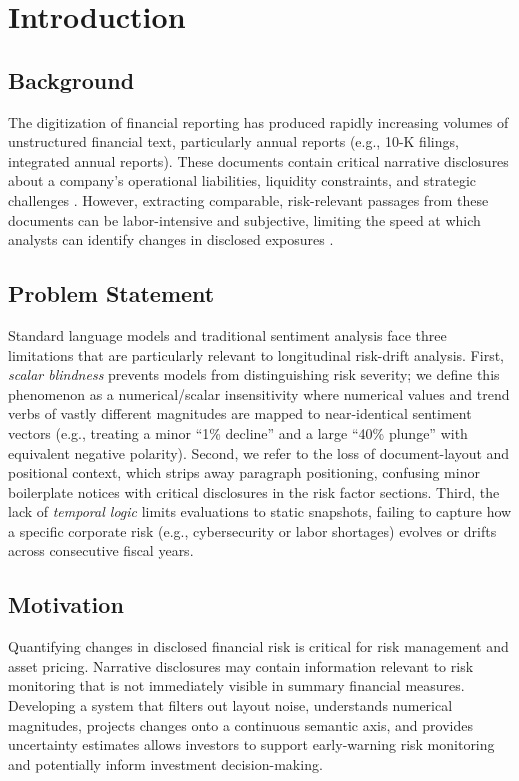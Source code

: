 \documentclass[pdflatex,sn-basic,Numbered]{sn-jnl}
\begin{document}
\maketitle

\section{Introduction}

\subsection{Background}
The digitization of financial reporting has produced rapidly increasing volumes of unstructured financial text, particularly annual reports (e.g., 10-K filings, integrated annual reports). These documents contain critical narrative disclosures about a company's operational liabilities, liquidity constraints, and strategic challenges \cite{campbell2014, kravet2013, linsley2006}. However, extracting comparable, risk-relevant passages from these documents can be labor-intensive and subjective, limiting the speed at which analysts can identify changes in disclosed exposures \cite{fisher2016}.

\subsection{Problem Statement}
Standard language models and traditional sentiment analysis face three limitations that are particularly relevant to longitudinal risk-drift analysis. First, \textit{scalar blindness} prevents models from distinguishing risk severity; we define this phenomenon as a numerical/scalar insensitivity where numerical values and trend verbs of vastly different magnitudes are mapped to near-identical sentiment vectors (e.g., treating a minor ``1\% decline'' and a large ``40\% plunge'' with equivalent negative polarity). Second, we refer to the loss of document-layout and positional context, which strips away paragraph positioning, confusing minor boilerplate notices with critical disclosures in the risk factor sections. Third, the lack of \textit{temporal logic} limits evaluations to static snapshots, failing to capture how a specific corporate risk (e.g., cybersecurity or labor shortages) evolves or drifts across consecutive fiscal years.

\subsection{Motivation}
Quantifying changes in disclosed financial risk is critical for risk management and asset pricing. Narrative disclosures may contain information relevant to risk monitoring that is not immediately visible in summary financial measures. Developing a system that filters out layout noise, understands numerical magnitudes, projects changes onto a continuous semantic axis, and provides uncertainty estimates allows investors to support early-warning risk monitoring and potentially inform investment decision-making.
\end{document}
